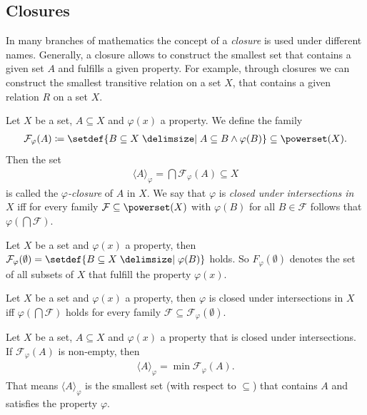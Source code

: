 \subsection{Closures}

In many branches of mathematics the concept of a \emph{closure} is used under different names. Generally, a closure allows to construct the smallest set that contains a given set $A$ and fulfills a given property. For example, through closures we can construct the smallest transitive relation on a set $X$, that contains a given relation $R$ on a set $X$.

\begin{definition}\label{definition:relations:closure}
    Let $X$ be a set, $A\subseteq X$ and $\varphi(x)$ a property. We define the family
    \begin{align}\mathcal F_\varphi(A)\coloneq \setdef{B\subseteq X\given A\subseteq B\land \varphi(B)}\subseteq \powerset(X).\end{align}
    Then the set
    \begin{align}\langle A\rangle_\varphi=\bigcap \mathcal F_\varphi(A)\subseteq X\end{align}
    is called the \emph{$\varphi$-closure} of $A$ in $X$. We say that $\varphi$ is \emph{closed under intersections in $X$} iff for every family $\mathcal F\subseteq\powerset(X)$ with $\varphi(B)$ for all $B\in\mathcal F$ follows that $\varphi(\bigcap\mathcal F)$.
\end{definition}

\begin{remarks}
    \begin{remarkenumerate}
        \item Let $X$ be a set and $\varphi(x)$ a property, then $\mathcal F_\varphi(\emptyset)=\setdef{B\subseteq X\given \varphi(B)}$ holds. So $F_\varphi(\emptyset)$ denotes the set of all subsets of $X$ that fulfill the property $\varphi(x)$.
        \item Let $X$ be a set and $\varphi(x)$ a property, then $\varphi$ is closed under intersections in $X$ iff $\varphi(\bigcap\mathcal F)$ holds for every family $\mathcal F\subseteq \mathcal F_\varphi(\emptyset)$.
    \end{remarkenumerate}
\end{remarks}

\begin{theorem}\label{theorem:relations:closure_minimal}
    Let $X$ be a set, $A\subseteq X$ and $\varphi(x)$ a property that is closed under intersections. If $\mathcal F_\varphi(A)$ is non-empty, then \begin{align}\langle A\rangle_\varphi=\min\mathcal F_\varphi(A).\end{align}
    That means $\langle A\rangle_\varphi$ is the smallest set (with respect to $\subseteq$) that contains $A$ and satisfies the property $\varphi$.
\end{theorem}

